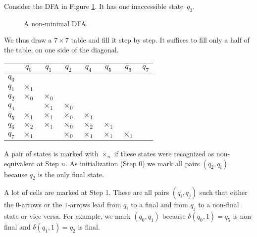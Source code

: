 \begin{page}

\begin{exl}
Consider the DFA in Figure \ref{fig:DFAMinim}.
It has one inaccessible state~$q_3$.

\begin{figure}[ht]
\begin{center}

\end{center}
\caption{A non-minimal DFA.}
\label{fig:DFAMinim}
\end{figure}

We thus draw a $7 \times 7$ table and fill it step by step.
It suffices to fill only a half of the table, on one side of the diagonal.

\renewcommand{\arraystretch}{1.7}
\begin{center}
\begin{tabular}{c|c|c|c|c|c|c|c|}
& $q_0$ & $q_1$ & $q_2$ & $q_4$ & $q_5$ & $q_6$ & $q_7$\\\hline
$q_0$ & \cellcolor{lightgray} &&&&&&\\\hline
$q_1$ & $\times_1$ & \cellcolor{lightgray} &&&&&\\\hline
$q_2$ & $\times_0$ & $\times_0$ & \cellcolor{lightgray} &&&&\\\hline
$q_4$ &  & $\times_1$ & $\times_0$ & \cellcolor{lightgray} &&&\\\hline
$q_5$ & $\times_1$ & $\times_1$ & $\times_0$ & $\times_1$ & \cellcolor{lightgray} &&\\\hline
$q_6$ & $\times_2$ & $\times_1$ & $\times_0$ & $\times_2$ & $\times_1$ & \cellcolor{lightgray} &\\\hline
$q_7$ & $\times_1$ &  & $\times_0$ & $\times_1$ & $\times_1$ & $\times_1$ & \cellcolor{lightgray}\\\hline
\end{tabular}
\end{center}

A pair of states is marked with $\times_n$ if these states were recognized as non-equivalent at Step $n$.
As initialization (Step 0) we mark all pairs $(q_2, q_i)$ because $q_2$ is the only final state.

A lot of cells are marked at Step 1.
These are all pairs $(q_i, q_j)$ such that either the $0$-arrows or the $1$-arrows lead from $q_i$ to a final and from $q_j$ to a non-final state or vice versa.
For example, we mark $(q_0, q_1)$ because $\delta(q_0, 1) = q_5$ is non-final and $\delta(q_1, 1) = q_2$ is final.


\end{exl}
\end{page}
